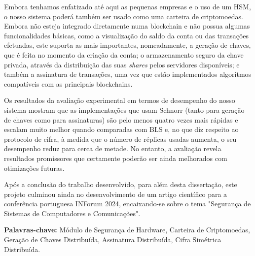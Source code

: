 Embora tenhamos enfatizado até aqui as pequenas empresas e o uso de um HSM, o nosso sistema poderá também ser usado como uma carteira de criptomoedas. Embora não esteja integrado diretamente numa blockchain e não possua algumas funcionalidades básicas, como a visualização do saldo da conta ou das transações efetuadas, este suporta as mais importantes, nomeadamente, a geração de chaves, que é feita no momento da criação da conta; o armazenamento seguro da chave privada, através da distribuição das suas \textit{shares} pelos servidores disponíveis; e também a assinatura de transações, uma vez que estão implementados algoritmos compatíveis com as principais blockchains.

Os resultados da avaliação experimental em termos de desempenho do nosso sistema mostram que as implementações que usam Schnorr (tanto para geração de chaves como para assinaturas) são pelo menos quatro vezes mais rápidas e escalam muito melhor quando comparadas com BLS e, no que diz respeito ao protocolo de cifra, à medida que o número de réplicas usadas aumenta, o seu desempenho reduz para cerca de metade. No entanto, a avaliação revela resultados promissores que certamente poderão ser ainda melhorados com otimizações futuras.

Após a conclusão do trabalho desenvolvido, para além desta dissertação, este projeto culminou ainda no desenvolvimento de um artigo científico para a conferência portuguesa INForum 2024, encaixando-se sobre o tema "Segurança de Sistemas de Computadores e Comunicações".


\vfill

\begin{flushleft}
\textbf{Palavras-chave:}
Módulo de Segurança de Hardware, Carteira de Criptomoedas, Geração de Chaves Distribuída, Assinatura Distribuída, Cifra Simétrica Distribuída.
\end{flushleft}

\LIMPA

